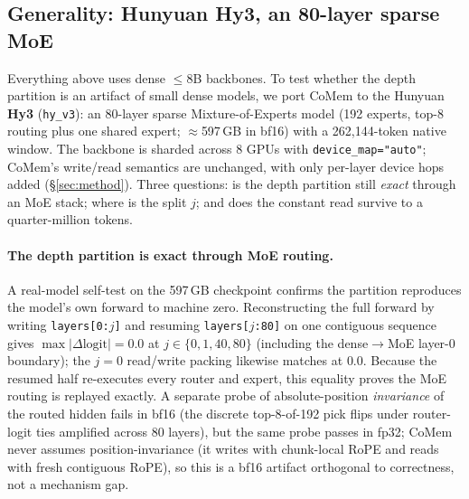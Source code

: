 




\subsection{Generality: Hunyuan Hy3, an 80-layer sparse MoE}
\label{sec:hy3-general}
Everything above uses dense $\le$8B backbones. To test whether the depth
partition is an artifact of small dense models, we port CoMem to the
Hunyuan \textbf{Hy3} (\texttt{hy\_v3}): an 80-layer sparse Mixture-of-Experts
model (192 experts, top-8 routing plus one shared expert; $\approx$597\,GB in
bf16) with a 262{,}144-token native window. The backbone is sharded across 8
GPUs with \texttt{device\_map="auto"}; CoMem's write/read semantics are
unchanged, with only per-layer device hops added (\S\ref{sec:method}). Three
questions: is the depth partition still \emph{exact} through an MoE stack; where
is the split $j$; and does the constant read survive to a quarter-million tokens.

\paragraph{The depth partition is exact through MoE routing.} A real-model
self-test on the 597\,GB checkpoint confirms the partition reproduces the
model's own forward to machine zero. Reconstructing the full forward by writing
\texttt{layers[0:$j$]} and resuming \texttt{layers[$j$:80]} on one contiguous
sequence gives $\max|\Delta\text{logit}|{=}0.0$ at $j\in\{0,1,40,80\}$
(including the dense$\to$MoE layer-0 boundary); the $j{=}0$ read/write packing
likewise matches at $0.0$. Because the resumed half re-executes every router and
expert, this equality proves the MoE routing is replayed exactly. A separate
probe of absolute-position \emph{invariance} of the routed hidden fails in bf16
(the discrete top-8-of-192 pick flips under router-logit ties amplified across
80 layers), but the same probe passes in fp32; CoMem never assumes
position-invariance (it writes with chunk-local RoPE and reads with fresh
contiguous RoPE), so this is a bf16 artifact orthogonal to correctness, not a
mechanism gap.

